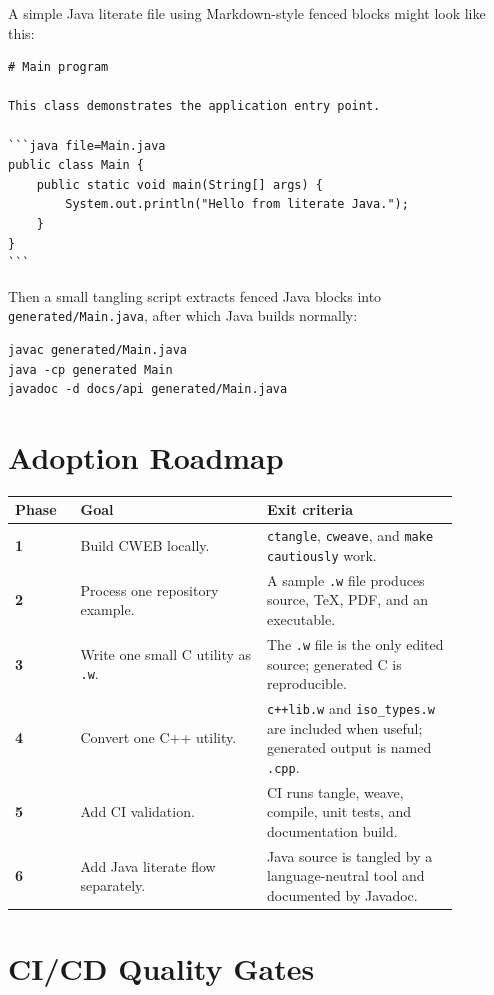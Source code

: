 \documentclass[11pt]{article}
\begin{document}
A simple Java literate file using Markdown-style fenced blocks might look like this:

\begin{verbatim}
# Main program

This class demonstrates the application entry point.

```java file=Main.java
public class Main {
    public static void main(String[] args) {
        System.out.println("Hello from literate Java.");
    }
}
```
\end{verbatim}

Then a small tangling script extracts fenced Java blocks into \texttt{generated/Main.java}, after which Java builds normally:

\begin{verbatim}
javac generated/Main.java
java -cp generated Main
javadoc -d docs/api generated/Main.java
\end{verbatim}

\section{Adoption Roadmap}

\begin{longtable}{>{\bfseries}p{0.13\linewidth} p{0.37\linewidth} p{0.38\linewidth}}
\toprule
Phase & Goal & Exit criteria \\
\midrule
1 & Build CWEB locally. & \texttt{ctangle}, \texttt{cweave}, and \texttt{make cautiously} work. \\
2 & Process one repository example. & A sample \texttt{.w} file produces source, TeX, PDF, and an executable. \\
3 & Write one small C utility as \texttt{.w}. & The \texttt{.w} file is the only edited source; generated C is reproducible. \\
4 & Convert one C++ utility. & \texttt{c++lib.w} and \texttt{iso\_types.w} are included when useful; generated output is named \texttt{.cpp}. \\
5 & Add CI validation. & CI runs tangle, weave, compile, unit tests, and documentation build. \\
6 & Add Java literate flow separately. & Java source is tangled by a language-neutral tool and documented by Javadoc. \\
\bottomrule
\end{longtable}

\section{CI/CD Quality Gates}
\end{document}
